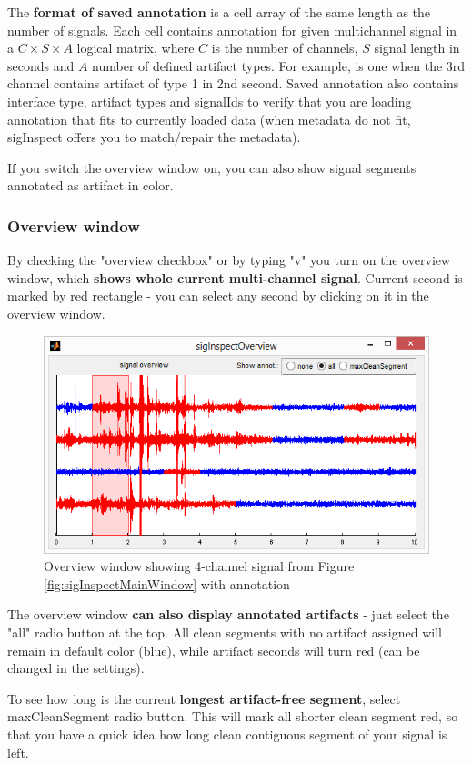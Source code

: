 \documentclass[a4paper,10pt]{article}
\begin{document}
The \textbf{format of saved annotation} is a cell array of the same length as the number of signals. Each cell contains annotation for given multichannel signal in a $C \times S\times A$ logical matrix, where $C$ is the number of channels, $S$ signal length in seconds and $A$ number of defined artifact types. For example,  is one when the 3rd channel contains artifact of type 1 in 2nd second. Saved annotation also contains interface type, artifact types and signalIds to verify that you are loading annotation that fits to currently loaded data (when metadata do not fit, sigInspect offers you to match/repair the metadata).

If you switch the overview window on, you can also show signal segments annotated as artifact in color.

\subsubsection{Overview window}
By checking the "overview checkbox" or by typing "v" you turn on the overview window, which \textbf{shows whole current multi-channel signal}. Current second is marked by red rectangle - you can select any second by clicking on it in the overview window.

\begin{figure} [htb]
\centering
\includegraphics[width=.6\textwidth]{sigInspectOverview.png} 
\caption{Overview window showing 4-channel signal from Figure \ref{fig:sigInspectMainWindow} with  annotation}
\label{fig:sigInspectOverviewWindow}
\end{figure}

The overview window \textbf{can also display annotated artifacts} - just select the "all" radio button at the top. All clean segments with no artifact assigned will remain in default color (blue), while artifact seconds will turn red (can be changed in the settings). 

To see how long is the current \textbf{longest artifact-free segment}, select maxCleanSegment radio button. This will mark all shorter clean segment red, so that you have a quick idea how long clean contiguous segment of your signal is left.
\end{document}
